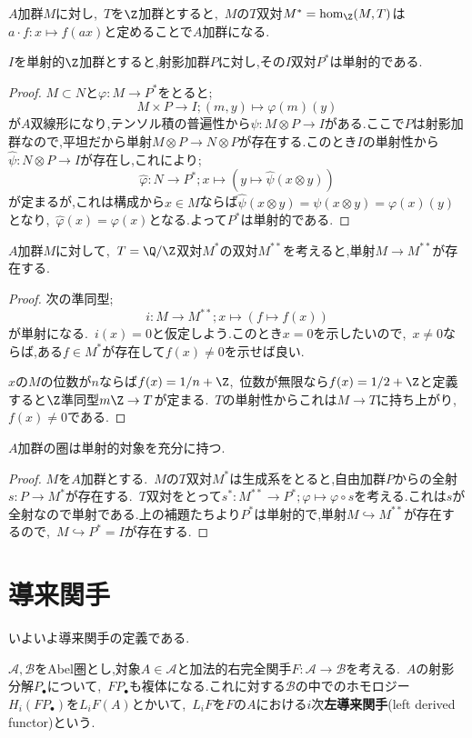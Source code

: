 $A$加群$M$に対し,~$T$を$\Z$加群とすると,~$M$の$T$双対$M^\ast=\hom_{\Z}(M,T)$は$a\cdot f:x\mapsto f(ax)$と定めることで$A$加群になる.
\begin{lem}
	$I$を単射的$\Z$加群とすると,射影加群$P$に対し,その$I$双対$P^\ast$は単射的である.
\end{lem}
\begin{proof}
	$M\subset N$と$\varphi:M\to P^\ast$をとると;
	\[M\times P\to I;(m,y)\mapsto \varphi(m)(y)\]
	が$A$双線形になり,テンソル積の普遍性から$\psi:M\otimes P\to I$がある.ここで$P$は射影加群なので,平坦だから単射$M\otimes P\to N\otimes P$が存在する.このとき$I$の単射性から$\hat\psi:N\otimes P\to I$が存在し,これにより;
	\[\hat\varphi:N\to P^\ast; x\mapsto (y\mapsto \hat\psi(x\otimes y))\]
	が定まるが,これは構成から$x\in M$ならば$\hat\psi(x\otimes y)=\psi(x\otimes y)=\varphi(x)(y)$となり,~$\hat\varphi(x)=\varphi(x)$となる.よって$P^\ast$は単射的である.
\end{proof}
\begin{lem}
	$A$加群$M$に対して,~$T=\Q/\Z$双対$M^\ast$の双対$M^{\ast\ast}$を考えると,単射$M\to M^{\ast\ast}$が存在する.
\end{lem}
\begin{proof}
	次の準同型;
	\[i:M\to M^{\ast\ast};x\mapsto (f\mapsto f(x))\]
	が単射になる.~$i(x)=0$と仮定しよう.このとき$x=0$を示したいので,~$x\neq0$ならば,ある$f\in M^\ast$が存在して$f(x)\neq0$を示せば良い.
	
	$x$の$M$の位数が$n$ならば$f(x)=1/n+\Z$,~位数が無限なら$f(x)=1/2+\Z$と定義すると$\Z$準同型$m\Z\to T$が定まる.~$T$の単射性からこれは$M\to T$に持ち上がり,~$f(x)\neq0$である.
\end{proof}
\begin{thm}
	$A$加群の圏は単射的対象を充分に持つ.
\end{thm}
\begin{proof}
	$M$を$A$加群とする.~$M$の$T$双対$M^\ast$は生成系をとると,自由加群$P$からの全射$s:P\to M^\ast$が存在する.~$T$双対をとって$s^\ast:M^{\ast\ast}\to P^\ast;\varphi\mapsto\varphi\circ s$を考える.これは$s$が全射なので単射である.上の補題たちより$P^\ast$は単射的で,単射$M\hookrightarrow M^{\ast\ast}$が存在するので,~$M\hookrightarrow P^\ast=I$が存在する.
\end{proof}

\section{導来関手}

いよいよ導来関手の定義である.
\begin{defi}[左導来関手]
	$\mathscr{A,B}$をAbel圏とし,対象$A\in\mathscr{A}$と加法的右完全関手$F:\mathscr{A}\to\mathscr{B}$を考える.~$A$の射影分解$P_\bullet$について,~$F P_\bullet$も複体になる.これに対する$\mathscr{B}$の中でのホモロジー$H_i(F P_\bullet)$を$L_i F (A)$とかいて,~$L_iF$を$F$の$A$における$i$次\textbf{左導来関手}(left derived functor)という.
\end{defi}


